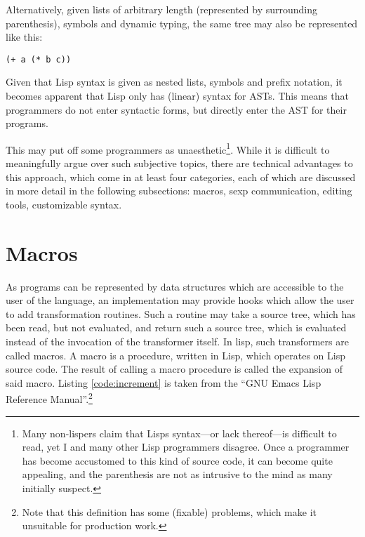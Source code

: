 \documentclass[a4paper,10pt,twoside]{report}
\begin{document}
Alternatively, given lists of arbitrary length (represented by surrounding
parenthesis), symbols and dynamic typing, the same tree may also be represented
like this:


\begin{lstlisting}[style=lispinline]
  (+ a (* b c))
\end{lstlisting}

Given that Lisp syntax is given as nested lists, symbols and prefix notation, it
becomes apparent that Lisp only has (linear) syntax for ASTs.  This means that
programmers do not enter syntactic forms, but directly enter the AST for their
programs.

This may put off some programmers as unaesthetic\footnote{Many non-lispers claim
  that Lisps syntax---or lack thereof---is difficult to read, yet I and many
  other Lisp programmers disagree.  Once a programmer has become accustomed to
  this kind of source code, it can become quite appealing, and the parenthesis
  are not as intrusive to the mind as many initially suspect.}.  While it is
difficult to meaningfully argue over such subjective topics, there are technical
advantages to this approach, which come in at least four categories, each of
which are discussed in more detail in the following subsections: macros, sexp
communication, editing tools, customizable syntax.

\section{Macros}
\label{subsec:macros}

As programs can be represented by data structures which are accessible to the
user of the language, an implementation may provide hooks which allow the user
to add transformation routines.  Such a routine may take a source tree, which
has been read, but not evaluated, and return such a source tree, which is
evaluated instead of the invocation of the transformer itself.  In lisp, such
transformers are called macros.  A macro is a procedure, written in Lisp, which
operates on Lisp source code.  The result of calling a macro procedure is called
the expansion of said macro.  Listing \ref{code:increment} is taken from the
``GNU Emacs Lisp Reference Manual''.\footnote{Note that this definition has some
  (fixable) problems, which make it unsuitable for production work.}
\end{document}
